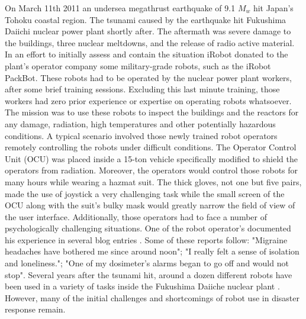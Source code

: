 \documentclass[a4paper,12pt,oneside,openright]{bhamthesis}
\begin{document}
On March 11th 2011 an undersea megathrust earthquake of 9.1 $M_w$ hit Japan's Tohoku coastal region. The tsunami caused by the earthquake hit Fukushima Daiichi nuclear power plant shortly after. The aftermath was severe damage to the buildings, three nuclear meltdowns, and the release of radio active material. In an effort to initially assess and contain the situation iRobot donated to the plant's operator company some military-grade robots, such as the iRobot PackBot. These robots had to be operated by the nuclear power plant workers, after some brief training sessions. Excluding this last minute training, those workers had zero prior experience or expertise on operating robots whatsoever. The mission was to use these robots to inspect the buildings and the reactors for any damage, radiation, high temperatures and other potentially hazardous conditions. A typical scenario involved those newly trained robot operators remotely controlling the robots under difficult conditions. The Operator Control Unit (OCU) was placed inside a 15-ton vehicle specifically modified to shield the operators from radiation. Moreover, the operators would control those robots for many hours while wearing a hazmat suit. The thick gloves, not one but five pairs, made the use of joystick a very challenging task while the small screen of the OCU along with the suit's bulky mask would greatly narrow the field of view of the user interface. Additionally, those operators had to face a number of psychologically challenging situations. One of the robot operator's documented his experience in several blog entries \cite{fuku_blog}. Some of these reports follow: "Migraine headaches have bothered me since around noon"; "I really felt a sense of isolation and loneliness."; "One of my dosimeter's alarms began to go off and would not stop". Several years after the tsunami hit, around a dozen different robots have been used in a variety of tasks inside the Fukushima Daiiche nuclear plant \cite{fuku_science}. However, many of the initial challenges and shortcomings of robot use in disaster response remain.
\end{document}
